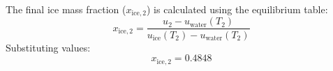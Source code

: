 The final ice mass fraction (\( x_{\text{ice},2} \)) is calculated using the equilibrium table:  
\[
x_{\text{ice},2} = \frac{u_2 - u_{\text{water}}(T_2)}{u_{\text{ice}}(T_2) - u_{\text{water}}(T_2)}
\]  
Substituting values:  
\[
x_{\text{ice},2} = 0.4848
\]